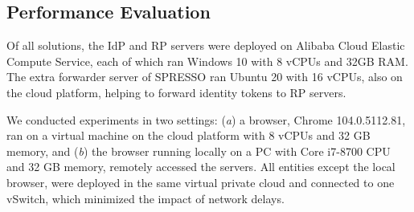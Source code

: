 \subsection{Performance Evaluation}
\label{sec:evaluation}


Of all solutions, the IdP and RP servers were deployed on Alibaba Cloud Elastic Compute Service, each of which ran Windows 10 with 8 vCPUs and 32GB RAM.
The extra forwarder server of SPRESSO ran Ubuntu 20 with 16 vCPUs, %
 also on the cloud platform, helping to forward identity tokens to RP servers.

We conducted experiments in two settings: (\emph{a}) a browser, Chrome 104.0.5112.81, ran on a virtual machine on the cloud platform with 8 vCPUs and 32 GB memory, and (\emph{b}) the browser running locally on a PC with Core i7-8700 CPU and 32 GB memory, remotely accessed the servers.
All entities except the local browser,
were deployed in the same virtual private cloud and connected to one vSwitch, which minimized the impact of network delays.

